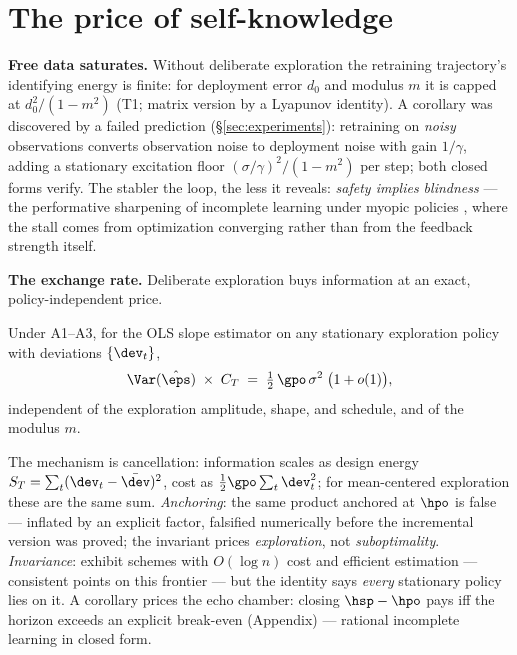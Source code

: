 \documentclass{article}
\begin{document}
\section{The price of self-knowledge}
\label{sec:price}

\textbf{Free data saturates.} Without deliberate exploration the retraining trajectory's identifying energy is finite: for deployment error $d_0$ and modulus $m$ it is capped at $d_0^2/(1-m^2)$ (T1; matrix version by a Lyapunov identity). A corollary was discovered by a failed prediction (\S\ref{sec:experiments}): retraining on \emph{noisy} observations converts observation noise to deployment noise with gain $1/\gamma$, adding a stationary excitation floor $(\sigma/\gamma)^2/(1-m^2)$ per step; both closed forms verify. The stabler the loop, the less it reveals: \emph{safety implies blindness} --- the performative sharpening of incomplete learning under myopic policies \citep{keskin2014dynamic,harrison2012bayesian}, where the stall comes from optimization converging rather than from the feedback strength itself.

\textbf{The exchange rate.} Deliberate exploration buys information at an exact, policy-independent price.

\begin{theorem}
\label{thm:exchange}
Under A1--A3, for the OLS slope estimator on any stationary exploration policy with deviations $\{\dev_t\}$,
\[
\Var(\hat\eps)\;\times\;C_T \;=\; \tfrac{1}{2}\,\gpo\,\sigma^2\;\big(1 + o(1)\big),
\]
independent of the exploration amplitude, shape, and schedule, and of the modulus $m$.
\end{theorem}

The mechanism is cancellation: information scales as design energy $S_T=\sum_t(\dev_t-\bar \dev)^2$, cost as $\tfrac{1}{2}\gpo\sum_t \dev_t^2$; for mean-centered exploration these are the same sum. \emph{Anchoring}: the same product anchored at $\hpo$ is false --- inflated by an explicit factor, falsified numerically before the incremental version was proved; the invariant prices \emph{exploration}, not \emph{suboptimality}. \emph{Invariance}: \citet{lai1979adaptive} exhibit schemes with $O(\log n)$ cost and efficient estimation --- consistent points on this frontier --- but the identity says \emph{every} stationary policy lies on it. A corollary prices the echo chamber: closing $\hsp - \hpo$ pays iff the horizon exceeds an explicit break-even (Appendix) --- rational incomplete learning \citep{rothschild1974two,easley1988controlling,aghion1991optimal} in closed form.
\end{document}
